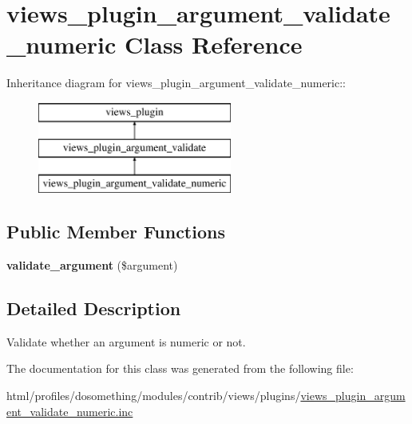\hypertarget{classviews__plugin__argument__validate__numeric}{
\section{views\_\-plugin\_\-argument\_\-validate\_\-numeric Class Reference}
\label{classviews__plugin__argument__validate__numeric}
}
Inheritance diagram for views\_\-plugin\_\-argument\_\-validate\_\-numeric::\begin{figure}[H]
\begin{center}
\leavevmode
\includegraphics[height=3cm]{classviews__plugin__argument__validate__numeric}
\end{center}
\end{figure}
\subsection*{Public Member Functions}
\begin{DoxyCompactItemize}
\item 
\hypertarget{classviews__plugin__argument__validate__numeric_ada84b4fc79f444e178c02b8d505b2d86}{
{\bfseries validate\_\-argument} (\$argument)}
\label{classviews__plugin__argument__validate__numeric_ada84b4fc79f444e178c02b8d505b2d86}

\end{DoxyCompactItemize}


\subsection{Detailed Description}
Validate whether an argument is numeric or not. 

The documentation for this class was generated from the following file:\begin{DoxyCompactItemize}
\item 
html/profiles/dosomething/modules/contrib/views/plugins/\hyperlink{views__plugin__argument__validate__numeric_8inc}{views\_\-plugin\_\-argument\_\-validate\_\-numeric.inc}\end{DoxyCompactItemize}
